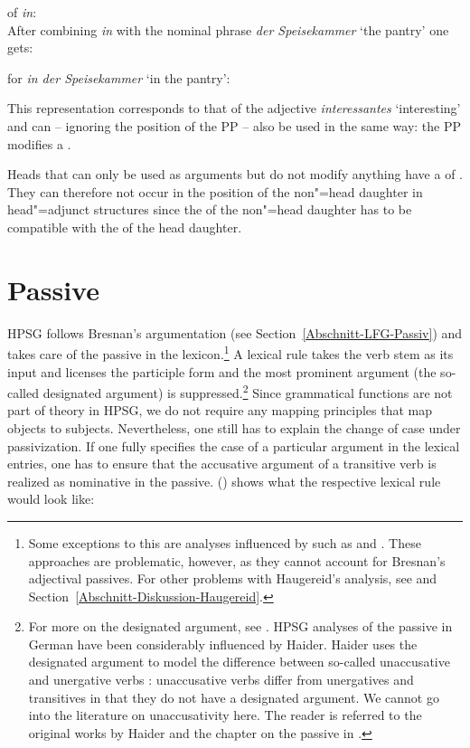 \ea
\catv of \emph{in}:\\
\z
After combining \emph{in} with the nominal phrase \emph{der Speisekammer} `the pantry' one gets:

\eas
\catv for \emph{in der Speisekammer} `in the pantry':\\
\zs

\noindent
This representation corresponds to that of the adjective \emph{interessantes} `interesting' and can -- ignoring the position of the PP -- also be used in the same way:
the PP modifies a \nbar.

Heads that can only be used as arguments but do not modify anything have a \modv of .
They can therefore not occur in the position of the non"=head daughter in head"=adjunct structures since the \modv of the non"=head daughter has to be compatible
with the \synsemv of the head daughter.

\section{Passive}
\label{Abschnitt-HPSG-Passiv}\label{sec-hpsg-passive}

HPSG follows Bresnan's argumentation (see Section~\ref{Abschnitt-LFG-Passiv}) and takes care of the passive in the lexicon.\footnote{%
	Some exceptions to this are analyses influenced by \cxg such as \citet{Tseng2007a} and \citet{Haugereid2007a}.
	These approaches are problematic, however, as they cannot account for Bresnan's adjectival passives. For other problems with
	Haugereid's analysis, see  and Section~\ref{Abschnitt-Diskussion-Haugereid}.%
} A lexical rule takes the verb stem as its input and licenses the participle form and the most prominent argument (the so-called
designated argument) is suppressed.\footnote{%
	For more on the designated argument, see . HPSG analyses of the passive in German have been considerably influenced by Haider.
	Haider uses the designated argument to model the difference between so-called unaccusative
        and unergative verbs \citep{Perlmutter78}: unaccusative verbs differ from unergatives and transitives in that they do not have
	a designated argument. We cannot go into the literature on unaccusativity here. The reader is referred to the original works by Haider and the
	chapter on the passive in .
}
Since grammatical functions are not part of theory in HPSG, we do not require any mapping principles that map objects to subjects.
Nevertheless, one still has to explain the change of case under passivization. If one fully
specifies the case of a particular argument in the lexical entries, one has to ensure that the
accusative argument of a transitive verb is realized as nominative in the passive. () shows
what the respective lexical rule would look like:

